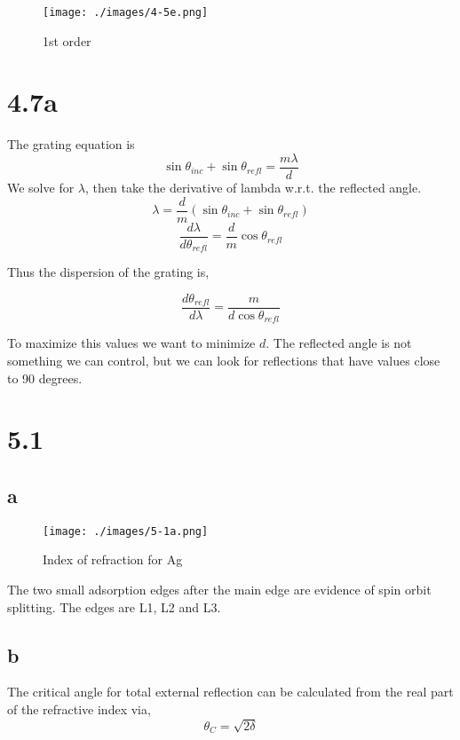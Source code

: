 \documentclass[12pt]{article}
\renewcommand{\d}[2]{\frac{d #1}{d #2}} %
\renewcommand{\=}[1]{\stackrel{#1}{=}} %
\theoremstyle{definition}
\theoremstyle{remark}
\begin{document}
\begin{figure}[H]
\centering
\texttt{[image: ./images/4-5e.png]}
\caption{1st order}
\label{4-5e}
\end{figure}
\newpage
\section*{4.7a}
The grating equation is 
\[
\sin\theta_{inc} + \sin\theta_{refl} = \dfrac{m\lambda}{d}
\]
We solve for $\lambda$, then take the derivative of lambda w.r.t. the reflected angle.
\[
\lambda = \dfrac{d}{m}\left(\sin\theta_{inc} + \sin\theta_{refl}\right)
\]
\[
\d{\lambda}{\theta_{refl}} = \dfrac{d}{m}\cos\theta_{refl}
\]

Thus the dispersion of the grating is,

\[
\d{\theta_{refl}}{\lambda} = \dfrac{m}{d\cos\theta_{refl}}
\]

To maximize this values we want to minimize $d$. The reflected angle is not something we can control, but we 
can look for reflections that have values close to 90 degrees.

\newpage
\section*{5.1}
\subsection*{a}
\begin{figure}[H]
\centering
\texttt{[image: ./images/5-1a.png]}
\caption{Index of refraction for Ag}
\label{5-1a}
\end{figure}

The two small adsorption edges after the main edge are evidence of spin orbit splitting. The edges are L1, L2 and L3.

\subsection*{b}
The critical angle for total external reflection can be calculated from the real part of the refractive index via,
\[
\theta_C = \sqrt{2\delta}
\]
\end{document}
